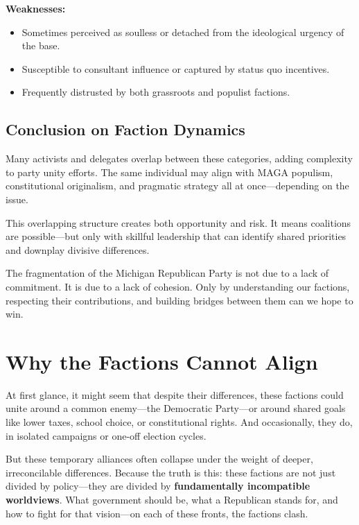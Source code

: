 \textbf{Weaknesses:}
\begin{itemize}
\item Sometimes perceived as soulless or detached from the ideological urgency of the base.
\item Susceptible to consultant influence or captured by status quo incentives.
\item Frequently distrusted by both grassroots and populist factions.
\end{itemize}

\subsection{Conclusion on Faction Dynamics}
Many activists and delegates overlap between these categories, adding complexity to party unity efforts. The same individual may align with MAGA populism, constitutional originalism, and pragmatic strategy all at once—depending on the issue.

This overlapping structure creates both opportunity and risk. It means coalitions are possible—but only with skillful leadership that can identify shared priorities and downplay divisive differences.

The fragmentation of the Michigan Republican Party is not due to a lack of commitment. It is due to a lack of cohesion. Only by understanding our factions, respecting their contributions, and building bridges between them can we hope to win.



\section{Why the Factions Cannot Align}

At first glance, it might seem that despite their differences, these factions could unite around a common enemy—the Democratic Party—or around shared goals like lower taxes, school choice, or constitutional rights. And occasionally, they do, in isolated campaigns or one-off election cycles.

But these temporary alliances often collapse under the weight of deeper, irreconcilable differences. Because the truth is this: these factions are not just divided by policy—they are divided by \textbf{fundamentally incompatible worldviews}. What government should be, what a Republican stands for, and how to fight for that vision—on each of these fronts, the factions clash.

